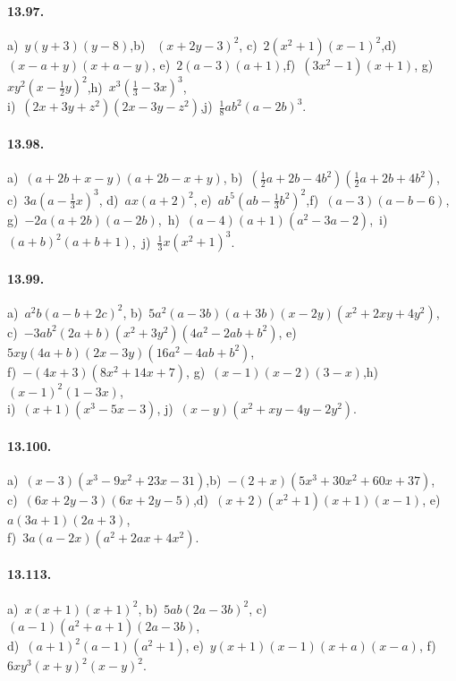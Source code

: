\paragraph{13.97.} a)~$y(y+3)(y-8)$,\quad b)~ $(x+2y-3)^{2}$,\quad
c)~$2(x^{2}+1)(x-1)^{2}$,\quad d)~$(x-a+y)(x+a-y)$,\quad
e)~$2(a-3)(a+1)$,\quad f)~$(3x^{2}-1)(x+1)$,\quad
g)~$xy^{2}(x-\frac{1}{2}y)^{2}$,\quad h)~$x^{3}\left(\frac{1}{3}-3x\right)^{3}$,\protect\\
i)~$(2x+3y+z^{2})(2x-3y-z^{2})$,\quad j)~$\frac{1}{8}{ab}^{2}(a-2b)^{3}$.

\paragraph{13.98.} a)~$(a+2b+x-y)(a+2b-x+y)$,\quad 
b)~$\left(\frac{1}{2}a+2b-4b^{2}\right)\left(\frac{1}{2}a+2b+4b^{2}\right)$,\protect\\
c)~$3a\left(a-\frac{1}{3}x\right)^{3}$,\quad
d)~$ax(a+2)^{2}$,\quad
e)~${ab}^{5}\left({ab}-\frac{1}{3}b^{2}\right)^{2}$,\quad f)~$(a-3)(a-b-6)$,\protect\\
g)~$-2a(a+2b)(a-2b)$,\,
h)~$(a-4)(a+1)(a^{2}-3a-2)$,\,
i)~$(a+b)^{2}(a+b+1)$,\, j)~$\frac{1}{3}x(x^{2}+1)^{3}$.

\paragraph{13.99.} a)~$a^{2}b(a-b+2c)^{2}$,\quad 
b)~$5a^{2}(a-3b)(a+3b)(x-2y)(x^{2}+2xy+4y^{2})$,\protect\\
c)~$-3{ab}^{2}(2a+b)(x^{2}+3y^{2})(4a^{2}-2{ab}+b^{2})$,\quad %
e)~$5xy(4a+b)(2x-3y)(16a^{2}-4{ab}+b^{2})$,\protect\\
f)~$-(4x+3)(8x^{2}+14x+7)$,\quad
g)~$(x-1)(x-2)(3-x)$,\quad h)~$(x-1)^{2}(1-3x)$,\protect\\
i)~$(x+1)(x^{3}-5x-3)$,\quad
j)~$(x-y)(x^{2}+xy-4y-2y^{2})$.

\paragraph{13.100.} a)~$(x-3)(x^{3}-9x^{2}+23x-31)$,\quad b)~$-(2+x)(5x^{3}+30x^{2}+60x+37)$,\protect\\
c)~$(6x+2y-3)(6x+2y-5)$,\quad d)~$(x+2)\left(x^{2}+1\right)(x+1)(x-1)$,\quad
e)~$a(3a+1)(2a+3)$,\protect\\ f)~$3a(a-2x)\left(a^{2}+2ax+4x^{2}\right)$.

\paragraph{13.113.}
a)~$x(x+1)(x+1)^{2}$,\quad 
b)~$5ab(2a-3b)^{2}$,\quad 
c)~$(a-1)\left(a^{2}+a+1\right)(2a-3b)$,\protect\\
d)~$(a+1)^{2}(a-1)\left(a^{2}+1\right)$,\quad 
e)~$y(x+1)(x-1)(x+a)(x-a)$,\quad 
f)~$6xy^{3}(x+y)^{2}(x-y)^{2}$.

